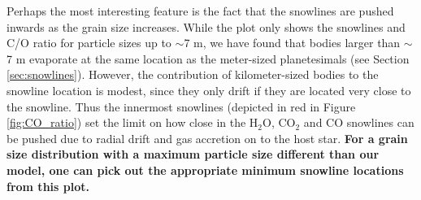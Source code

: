 \documentclass[apj]{emulateapj}
\begin{document}
Perhaps the most interesting feature is the fact that the snowlines are pushed inwards as the grain size increases. While the plot only shows the snowlines and C/O ratio for particle sizes up to $\sim$7 m, we have found that %
bodies larger than $\sim$7 m evaporate at the same location as the meter-sized planetesimals (see Section \ref{sec:snowlines}). However, the contribution of kilometer-sized bodies to the snowline location is modest, since they only drift if they are located very close to the snowline.
Thus the innermost snowlines (depicted in red in Figure \ref{fig:CO_ratio}) set the limit on how close in the H$_2$O, CO$_2$ and CO snowlines can be pushed due to radial drift and gas accretion on to the host star. \textbf{For a grain size distribution with a maximum particle size different than our model, one can pick out the appropriate minimum snowline locations from this plot.}%

\end{document}
